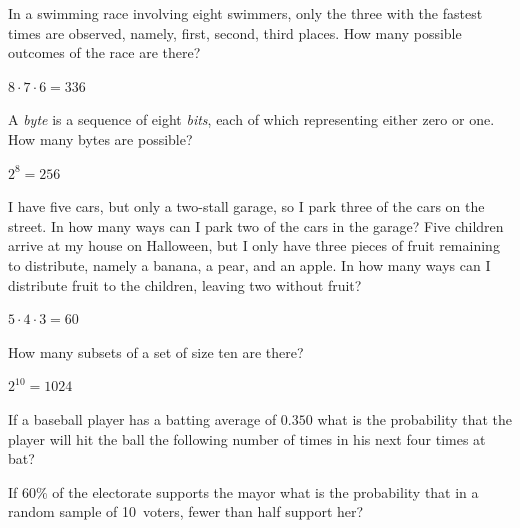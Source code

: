 \documentclass[12pt]{exam}
\begin{document}
\begin{questions}
\question In a swimming race involving eight swimmers, only the three
with the fastest times are observed,
namely, first, second, third places.
How many possible outcomes of the race are there?
\begin{solution} $8\cdot 7\cdot 6=336$ \end{solution}
\question A {\em byte} is a sequence of eight {\em bits}, each
of which representing either zero or one. How many bytes are possible?
\begin{solution} $2^8=256$\end{solution}

\question I have five cars, but only a two-stall garage, so I
park three of the cars on the street. In how many
ways can I park two of the cars in the garage?
\question Five children arrive at my house on Halloween,
but I only have three pieces of fruit remaining to distribute, namely
a banana, a pear, and an apple. In how many ways can I distribute
fruit to the children, leaving two without fruit?
\begin{solution} $5\cdot 4\cdot 3=60$\end{solution}

\question How many subsets of a set of size ten are there?
\begin{solution} $2^{10}=1024$\end{solution}

\question If a baseball player has a batting average
of $0.350$ what is the probability that the player
will hit the ball the following number of times in his next four
times at bat?

\question If $60\%$ of the electorate supports the mayor
what is the probability that in a random sample
of 10~voters, fewer than half support her?

\end{questions}
\end{document}
